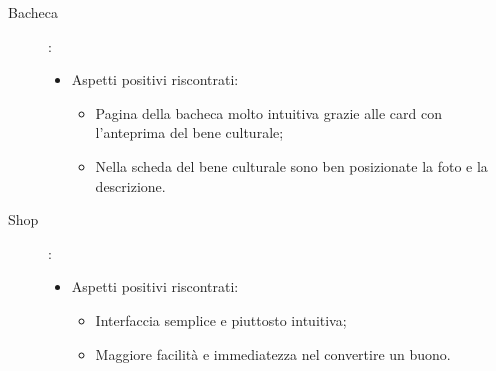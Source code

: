 \documentclass{article}
\begin{document}
\begin{description}
\item [Bacheca] :
\begin{itemize}
	\item Aspetti positivi riscontrati:
		\begin{itemize}
		\item Pagina della bacheca molto intuitiva grazie alle card con l’anteprima del bene culturale;
        \item Nella scheda del bene culturale sono ben posizionate la foto e la descrizione.
        \end{itemize}
	\end{itemize}
\item [Shop] :
\begin{itemize}
	\item Aspetti positivi riscontrati:
		\begin{itemize}
        \item Interfaccia semplice e piuttosto intuitiva;
        \item Maggiore facilità e immediatezza nel convertire un buono.
        \end{itemize}
	\end{itemize}
\end{description} 
\end{document}
